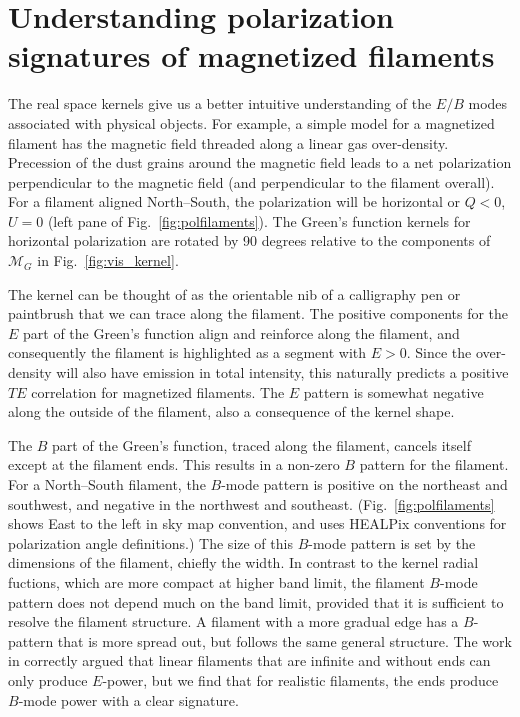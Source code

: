 \documentclass[a4paper,11pt]{article}
\newcommand{\mm}{\mathcal{M}}
\def\fig#1{{Fig.~\ref{#1}}}
\begin{document}
\section{Understanding polarization signatures of magnetized filaments}
\label{sec:pol_filaments}

The real space kernels give us a better intuitive understanding of the $E/B$ modes associated with physical objects.  For example, a simple model for a magnetized filament has the magnetic field threaded along a linear gas over-density.  Precession of the dust grains around the magnetic field leads to a net polarization perpendicular to the magnetic field (and perpendicular to the filament overall).  For a filament aligned North--South, the polarization will be horizontal or $Q<0$, $U=0$ (left pane of \fig{fig:polfilaments}).  The Green's function kernels for horizontal polarization are rotated by 90 degrees relative to the components of $\mm_G$ in \fig{fig:vis_kernel}.

The kernel can be thought of as the orientable nib of a calligraphy pen or paintbrush that we can trace along the filament.  The positive components for the $E$ part of the Green's function align and reinforce along the filament, and consequently the filament is highlighted as a segment with $E>0$.  Since the over-density will also have emission in total intensity, this naturally predicts a positive $TE$ correlation for magnetized filaments.  The $E$ pattern is somewhat negative along the outside of the filament, also a consequence of the kernel shape.

The $B$ part of the Green's function, traced along the filament, cancels itself except at the filament ends.  This results in a non-zero $B$ pattern for the filament.  
 For a North--South filament, the $B$-mode pattern is positive on the northeast and southwest, and negative in the northwest and southeast. (\fig{fig:polfilaments} shows East to the left in sky map convention, and uses HEALPix conventions for polarization angle definitions.)  The size of this $B$-mode pattern is set by the dimensions of the filament, chiefly the width.  In contrast to the kernel radial fuctions, which are more compact at higher band limit, the filament $B$-mode  pattern does not depend much on the band limit, provided that it is sufficient to resolve the filament structure.  A filament with a more gradual edge has a $B$-pattern that is more spread out, but follows the same general structure.  The work in \cite{Zaldarriaga2001a} correctly argued that linear filaments that are infinite and without ends can only produce $E$-power, but we find that for realistic filaments, the ends produce $B$-mode power with a clear signature. 
\end{document}
